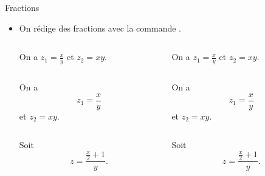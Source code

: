 \begin{frame}[fragile,c]{Fractions}
	\begin{itemize}
		\item On rédige des fractions avec la commande .
		\begin{columns}
			\begin{column}{.4\textwidth}
			\vspace{-4.5mm}
\begin{codesource}
	On a $z_1 = \frac{x}{y}$ et
	$z_2 = xy$.
\end{codesource}
			\end{column}
			\begin{column}{.4\textwidth}
				On a $z_1 = \frac{x}{y}$ et
				$z_2 = xy$.
			\end{column}
		\end{columns}
	
		\pause
		
		\begin{columns}
			\begin{column}{.4\textwidth}
				\vspace{-4.5mm}
\begin{codesource}
	On a
	\begin{equation*}
		z_1 = \frac{x}{y}
	\end{equation*}
	et $z_2 = xy$.
\end{codesource}
			\end{column}
			\begin{column}{.4\textwidth}
				On a
				\begin{equation*}
					z_1 = \frac{x}{y}
				\end{equation*}
				et $z_2 = xy$.
			\end{column}
		\end{columns}
	
		\pause
		
		\begin{columns}
			\begin{column}{.4\textwidth}
				\vspace{-4.5mm}
\begin{codesource}
	Soit
	\begin{equation*}
		z = \frac{\frac{x}{2} + 1}{y}.
	\end{equation*}
\end{codesource}
			\end{column}
			\begin{column}{.4\textwidth}
				Soit
				\begin{equation*}
					z = \frac{\frac{x}{2} + 1}{y}.
				\end{equation*}
			\end{column}
		\end{columns}
	\end{itemize}
\end{frame}

